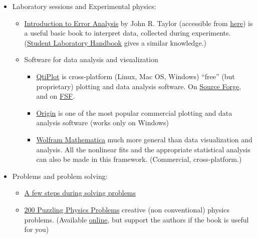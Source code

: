 \documentclass{article}
\begin{document}
\begin{itemize}
\item Laboratory sessions and Experimental physics:

\begin{itemize}
\item \href{https://www.goodreads.com/book/show/1017766.Introduction_to_Error_Analysis}{Introduction to Error Analysis} by John R. Taylor (accessible from
\href{https://web.archive.org/web/20200318010340/http://hep.ucsb.edu/courses/ph128_18s/Taylor.pdf}{here}) is a useful basic book to interpret data, collected during experiments. (\href{https://web.archive.org/web/20190801072249/http://www2.phy.ilstu.edu/~wenning/slh/}{Student Laboratory Handbook} gives a similar knowledge.)

\item Software for data analysis and visualization
\begin{itemize}
    \item \href{https://www.qtiplot.com/index.html}{QtiPlot} is cross-platform (Linux, Mac OS, Windows) ``free'' (but proprietary) plotting and data analysis software. On \href{https://sourceforge.net/projects/qtiplot.berlios/}{Source Forge}, and on \href{https://directory.fsf.org/wiki/Qtiplot}{FSF}.
    \item \href{https://www.originlab.com/}{Origin} is one of the most popular commercial plotting and data analysis software (works only on Windows)
    \item \href{https://www.wolfram.com/mathematica/}{Wolfram Mathematica} much more general than data visualization and analysis. All the nonlinear fits and the appropriate statistical analysis can also be made in this framework. (Commercial, cross-platform.)
\end{itemize}

\end{itemize}

\item Problems and problem solving:
\begin{itemize}
    
    \item \href{https://isaacphysics.org/solving_problems}{A few steps during solving problems}
    
    \item \href{https://www.cambridge.org/core/books/200-puzzling-physics-problems/BBD12C169F5FAFDA285F155D62A04D12}{200 Puzzling Physics Problems} creative (non conventional) physics problems. (Available \href{https://shrek.unideb.hu/~learner/elemifizika/200%20puzzling%20physics%20problem.pdf}{online}, but support the authors if the book is useful for you)
    

\end{itemize}
\end{itemize}
\end{document}
